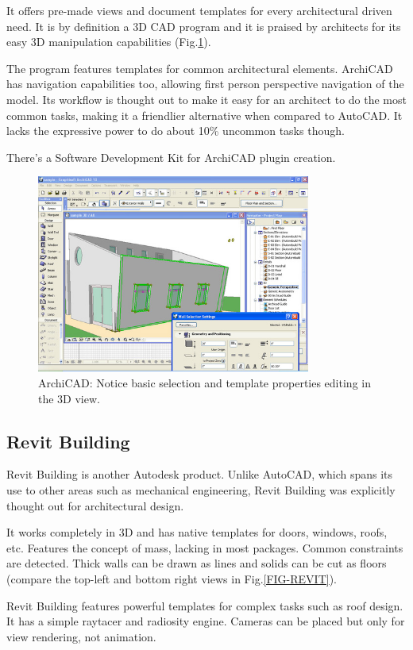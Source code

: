 It offers pre-made views and document templates for every architectural driven need.
It is by definition a 3D CAD program and it is praised by architects for its easy 3D
manipulation capabilities (Fig.\ref{FIG-ARCHICAD}).

The program features templates for common architectural elements.
ArchiCAD has navigation capabilities too, allowing first person perspective navigation of the model.
Its workflow is thought out to make it easy for an architect to do the most common tasks,
making it a friendlier alternative when compared to AutoCAD.
It lacks the expressive power to do about 10\% uncommon tasks though.

There's a Software Development Kit for ArchiCAD plugin creation.

\begin{figure}[!ht]
    \centering
    \includegraphics[width=9cm]{gfx/archicad-1.png}
    \caption{ArchiCAD: Notice basic selection and template properties editing in the 3D view.}
    \label{FIG-ARCHICAD}
\end{figure}

\subsection{Revit Building}
Revit Building\cite{SITE-REVIT} is another Autodesk product.
Unlike AutoCAD, which spans its use to other areas such as mechanical engineering,
Revit Building was explicitly thought out for architectural design.

It works completely in 3D and has native templates for doors, windows, roofs, etc.
Features the concept of mass, lacking in most packages.
Common constraints are detected. Thick walls can be drawn as lines and solids can
be cut as floors (compare the top-left and bottom right views in Fig.\ref{FIG-REVIT}).

Revit Building features powerful templates for complex tasks such as roof design.
It has a simple raytacer and radiosity engine. Cameras can be placed but only for view
rendering, not animation.

